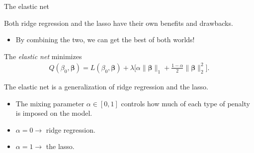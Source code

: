 \documentclass[8pt]{beamer}
\newcommand{\mys}{\vspace{0.5cm} \pause
}
\newcommand{\mysa}{\vspace{0.2cm} \pause
}
\begin{document}
\begin{frame}{The elastic net}

Both ridge regression and the lasso have their own benefits and drawbacks. 
\begin{itemize}
    \item By combining the two, we can get the best of both worlds!
\end{itemize} \mys

The \textit{elastic net} minimizes 
\begin{align}
    \label{enet}
    Q(\beta_0, \bm{\beta}) = L(\beta_0, \bm{\beta})
    + \lambda \Big[ \alpha \| \bm{\beta} \|_{1} + \frac{1 - \alpha}{2} \|\bm{\beta}\|_{2}^{2} \Big].
\end{align} \mysa

The elastic net is a generalization of ridge regression and the lasso.
\begin{itemize}
    \item The mixing parameter $\alpha \in [0,1]$ controls how much of each type of penalty is imposed on the model.
    \item $\alpha = 0 \to$ ridge regression.
    \item $\alpha = 1 \to$ the lasso.
\end{itemize} %

    
\end{frame}
\end{document}
